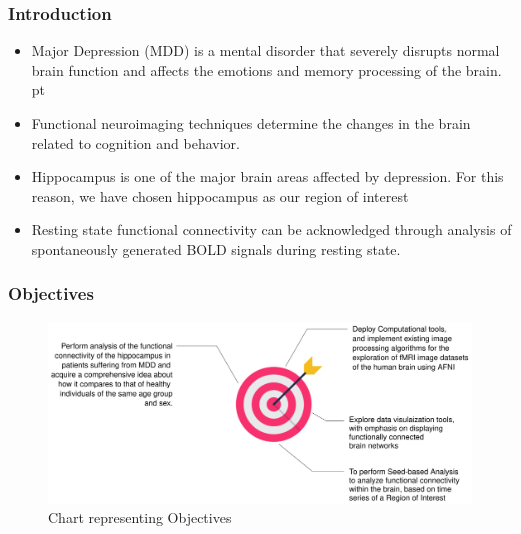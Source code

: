 \documentclass{beamer}
\begin{document}
  \begin{frame}[t]
    \frametitle{Introduction}

      \vskip 15pt

    \begin{itemize}

      \item Major Depression (MDD) is a mental disorder that severely
        disrupts normal brain function and affects the emotions and
        memory processing of the brain.  pt

      \item Functional neuroimaging techniques determine the changes
        in the brain related to cognition and behavior.  \vskip 10pt

      \item Hippocampus is one of the major brain areas affected by
        depression. For this reason, we have chosen hippocampus as our
        region of interest\vskip 10pt

      \item Resting state functional connectivity can be acknowledged
        through analysis of spontaneously generated BOLD signals
        during resting state.

    \end{itemize}

  \end{frame}

  \begin{frame}[t]
    \frametitle{Objectives}

    \vskip 15pt

    \begin{figure}[H]
      \centering
      \includegraphics[width=\textwidth]{objectives.png}
      \caption{Chart representing Objectives}
    \end{figure}

  \end{frame}
\end{document}
